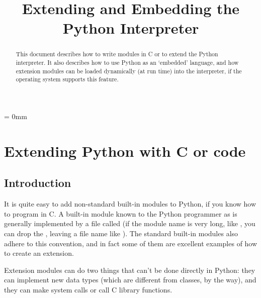 

\title{Extending and Embedding the Python Interpreter}



\makeindex




\maketitle



\begin{abstract}

\noindent
This document describes how to write modules in C or \Cpp{} to extend the
Python interpreter.  It also describes how to use Python as an
`embedded' language, and how extension modules can be loaded
dynamically (at run time) into the interpreter, if the operating
system supports this feature.

\end{abstract}

\pagebreak

{
\parskip = 0mm
\tableofcontents
}

\pagebreak



\chapter{Extending Python with C or \Cpp{} code}


\section{Introduction}

It is quite easy to add non-standard built-in modules to Python, if
you know how to program in C.  A built-in module known to the Python
programmer as  is generally implemented by a file called
 (if the module name is very long, like
, you can drop the , leaving a file name
like ).  The standard built-in modules also adhere to
this convention, and in fact some of them are excellent examples of
how to create an extension.

Extension modules can do two things that can't be done directly in
Python: they can implement new data types (which are different from
classes, by the way), and they can make system calls or call C library
functions.

